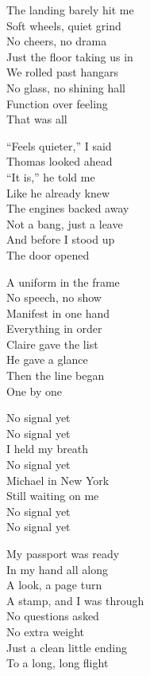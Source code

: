 \begin{lyrics}
The landing barely hit me\\
Soft wheels, quiet grind\\
No cheers, no drama\\
Just the floor taking us in\\
We rolled past hangars\\
No glass, no shining hall\\
Function over feeling\\
That was all

“Feels quieter,” I said\\
Thomas looked ahead\\
“It is,” he told me\\
Like he already knew\\
The engines backed away\\
Not a bang, just a leave\\
And before I stood up\\
The door opened

A uniform in the frame\\
No speech, no show\\
Manifest in one hand\\
Everything in order\\
Claire gave the list\\
He gave a glance\\
Then the line began\\
One by one

No signal yet\\
No signal yet\\
I held my breath\\
No signal yet\\
Michael in New York\\
Still waiting on me\\
No signal yet\\
No signal yet

My passport was ready\\
In my hand all along\\
A look, a page turn\\
A stamp, and I was through\\
No questions asked\\
No extra weight\\
Just a clean little ending\\
To a long, long flight


\end{lyrics}
